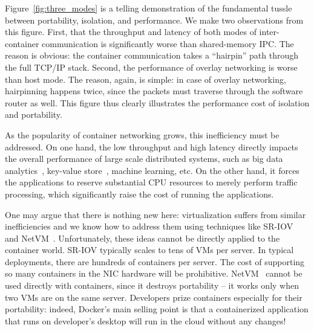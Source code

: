 

Figure~\ref{fig:three_modes} is a telling demonstration of the fundamental
tussle between portability, isolation, and performance. We make two
observations from this figure. First, that the throughput and latency of both
modes of inter-container communication is significantly worse than
shared-memory IPC. The reason is obvious: the container communication takes a
``hairpin'' path through the full TCP/IP stack. Second, the performance of
overlay networking is worse than host mode. The reason, again, is simple: in
case of overlay networking, hairpinning happens twice, since the packets must
traverse through the software router as well. This figure thus clearly
illustrates the performance cost of isolation and portability.

As the popularity of container networking grows, this inefficiency must be
addressed. On one hand, the low throughput and high latency directly impacts
the overall performance of large scale distributed systems, such as big data
analytics~\cite{choudhury-paper,mapreduce,hadoop}, key-value store~\cite{farm,cassandra,bigtable}, machine learning,
etc.  On the other hand, it forces the applications to reserve substantial CPU
resources to merely perform traffic processing, which significantly raise the
cost of running the applications.

One may argue that there is nothing new here: virtualization suffers from
similar inefficiencies and we know how to address them using techniques like
SR-IOV~\cite{sriov} and NetVM~\cite{netvm}. Unfortunately, these ideas cannot be directly applied to the container world.
SR-IOV typically scales to tens of VMs per server. In typical deployments, there
are hundreds of containers per server. The cost of supporting so many containers
in the NIC hardware will be prohibitive.  NetVM~\cite{netvm} cannot be used
directly with containers, since it destroys portability -- it works only when
two VMs are on the same server.  Developers prize containers especially for
their portability: indeed, Docker's main selling point is that a containerized
application that runs on developer's desktop will run in the cloud without any
changes! 


